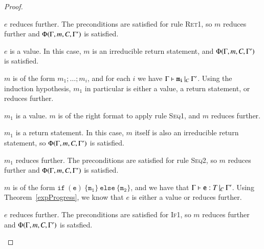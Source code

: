 \begin{proof}
\begin{case}
  	\begin{subcase}
  	  $e$ reduces further.
  	  The preconditions are satisfied for rule \textsc{Ret1}, so $m$ reduces
  	  further and $\Phi(\Gamma, m, C, \Gamma')$ is satisfied.  
  	\end{subcase}

  	\begin{subcase}
  	  $e$ is a value.
  	  In this case, $m$ is an irreducible return statement, and $\Phi(\Gamma, m, C, \Gamma')$ is
  	  satisfied.
	\end{subcase}  

  \end{case}

  \begin{case}[SeqTypable]\label{case:prog-seqtypable}

	$m$ is of the form $m_1; \dots; m_i$, and for each $i$ we have
	$\Gamma{}\vdash\mathtt{m_i}\, |_C \:\Gamma '$. Using the induction hypothesis, $m_1$ in particular is
	either a value, a return statement, or reduces further.

	\begin{subcase}
	  $m_1$ is a value.
	  $m$ is of the right format to apply rule \textsc{Seq1}, and $m$ reduces
	  further. 
	\end{subcase}

	\begin{subcase}
	  $m_1$ is a return statement.
	  In this case, $m$ itself is also an irreducible return statement, so
	  $\Phi(\Gamma, m, C, \Gamma')$ is satisfied. 
	\end{subcase}

	\begin{subcase}
	  $m_1$ reduces further.
	  The preconditions are satisfied for rule \textsc{Seq2}, so $m$ reduces
	  further and $\Phi(\Gamma, m, C, \Gamma')$ is satisfied.
	\end{subcase}

  \end{case}

  \begin{case}[IfTypable]\label{case:prog-iftypable}

	$m$ is of the form $\mathtt{if\ (e)\ \{m_1\}\ else\ \{m_2\}}$, and we have
	that $\Gamma{}\vdash\mathtt{e}: T\,|_C\:\Gamma'$. Using Theorem~\ref{expProgress}, we know that $e$ is
	either a value or reduces further.

	\begin{subcase}
	  $e$ reduces further. 
	  The preconditions are satisfied for \textsc{If1}, so $m$ reduces
	  further and $\Phi(\Gamma, m, C, \Gamma')$ is satsfied.
	\end{subcase}


\end{case}
\end{proof}
